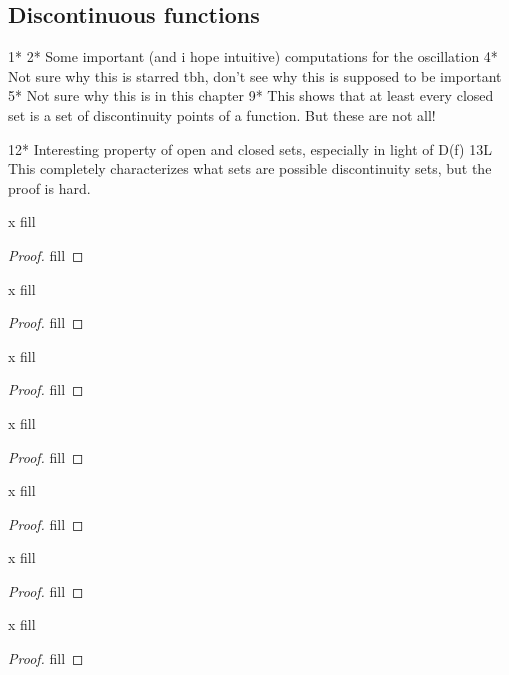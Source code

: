 \subsection{Discontinuous functions}


1*
2* Some important (and i hope intuitive) computations for the oscillation
4* Not sure why this is starred tbh, don't see why this is supposed to be important
5* Not sure why this is in this chapter
9* This shows that at least every closed set is a set of discontinuity points of a function. But these are not all!

12* Interesting property of open and closed sets, especially in light of D(f)
13L This completely characterizes what sets are possible discontinuity sets, but the proof is hard.

\begin{exercise}{x}
fill
\end{exercise}
\begin{proof}
fill
\end{proof} 

\begin{exercise}{x}
fill
\end{exercise}
\begin{proof}
fill
\end{proof} 

\begin{exercise}{x}
fill
\end{exercise}
\begin{proof}
fill
\end{proof} 

\begin{exercise}{x}
fill
\end{exercise}
\begin{proof}
fill
\end{proof} 

\begin{exercise}{x}
fill
\end{exercise}
\begin{proof}
fill
\end{proof} 

\begin{exercise}{x}
fill
\end{exercise}
\begin{proof}
fill
\end{proof} 

\begin{exercise}{x}
fill
\end{exercise}
\begin{proof}
fill
\end{proof} 

